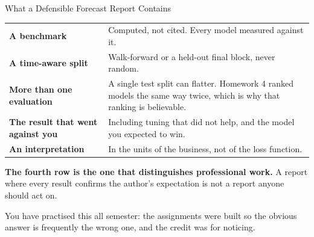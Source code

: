 \documentclass[aspectratio=169, 11pt]{beamer}
\begin{document}
\begin{frame}{What a Defensible Forecast Report Contains}
  \begin{center}
    {\small
    \begin{tabular}{p{3.4cm}p{8.9cm}}
      \toprule
      \textbf{A benchmark} & Computed, not cited. Every model measured against it. \\[2pt]
      \textbf{A time-aware split} & Walk-forward or a held-out final block, never random. \\[2pt]
      \textbf{More than one evaluation} & A single test split can flatter. Homework 4 ranked
      models the same way twice, which is why that ranking is believable. \\[2pt]
      \textbf{The result that went against you} & Including tuning that did not help, and the
      model you expected to win. \\[2pt]
      \textbf{An interpretation} & In the units of the business, not of the loss function. \\
      \bottomrule
    \end{tabular}
    }
  \end{center}

  \vspace{0.05cm}
  \textbf{The fourth row is the one that distinguishes professional work.} A report where every
  result confirms the author's expectation is not a report anyone should act on.

  \vspace{0.1cm}
  You have practised this all semester: the assignments were built so the obvious answer is
  frequently the wrong one, and the credit was for noticing.
\end{frame}
\end{document}
